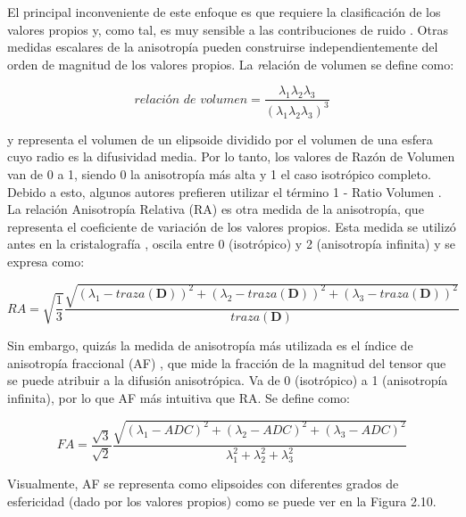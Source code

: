 El principal inconveniente de este enfoque es que requiere la clasificación de los valores propios y, como tal, es muy sensible a las contribuciones de ruido \cite{Pierpaoli_1996}.
Otras medidas escalares de la anisotropía pueden construirse independientemente del orden de magnitud de los valores propios. La {\emph relación de volumen} \cite{Pierpaoli_1996} se define como:

\begin{equation}
\textit{relaci\'on de volumen} = \frac{\lambda_{1}\lambda_{2}\lambda_{3}}{(\lambda_{1}\lambda_{2}\lambda_{3})^{3}}
\end{equation}

y representa el volumen de un elipsoide dividido por el volumen de una esfera cuyo radio es la difusividad media. Por lo tanto, los valores de Razón de Volumen van de 0 a 1, siendo 0 la anisotropía más alta y 1 el caso isotrópico completo. Debido a esto, algunos autores prefieren utilizar el término 1 - Ratio Volumen \cite{Pierpaoli_1996}.
La relación Anisotropía Relativa (RA) es otra medida de la anisotropía, que representa el coeficiente de variación de los valores propios. Esta medida se utilizó antes en la cristalografía \cite{Sands_1995}, oscila entre 0 (isotrópico) y 2 (anisotropía infinita) y se expresa como:

\begin{equation}
RA = \sqrt{\frac{1}{3}} \frac{\sqrt{(\lambda_{1} - traza (\textbf{D}))^{2} + (\lambda_{2} - traza (\textbf{D}))^{2} + (\lambda_{3} - traza (\textbf{D}))^{2}}}{traza (\textbf{D})}
\end{equation} 

Sin embargo, quizás la medida de anisotropía más utilizada es el índice de anisotropía fraccional (AF) \cite{Basser_1996}, que mide la fracción de la magnitud del tensor que se puede atribuir a la difusión anisotrópica. Va de 0 (isotrópico) a 1 (anisotropía infinita), por lo que AF más intuitiva que RA. Se define como:

\begin{equation}
FA = \frac{\sqrt{3}}{\sqrt{2}} \frac{\sqrt{(\lambda_{1} - ADC)^{2} + (\lambda_{2} - ADC)^{2} + (\lambda_{3} - ADC)^{2}}}{\lambda_1^2 + \lambda_2^2 + \lambda_3^2}
\end{equation}

Visualmente, AF se representa como elipsoides con diferentes grados de esfericidad (dado por los valores propios) como se puede ver en la Figura 2.10.\\

